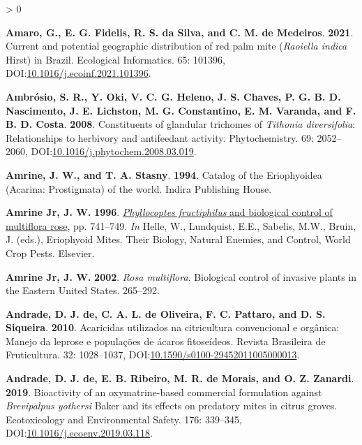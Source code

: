 \documentclass{ufdissertation}[overrideChapters] %
\newlength{\cslhangindent}
\newenvironment{CSLReferences}[2] %
 {%
  \setlength{\parindent}{0pt}
  \ifodd #1 \everypar{\setlength{\hangindent}{\cslhangindent}}\ignorespaces\fi
  \ifnum #2 > 0
  \setlength{\parskip}{#2\baselineskip}
  \fi
 }%
 {}
\begin{document}
{\begin{CSLReferences}{1}{1}
\leavevmode{}%
\textbf{Amaro, G., E. G. Fidelis, R. S. da Silva, and C. M. de Medeiros}. \textbf{2021}. Current and potential geographic distribution of red palm mite ({\emph{Raoiella indica}} {Hirst}) in {Brazil}. Ecological Informatics. 65: 101396, DOI:\href{https://doi.org/10.1016/j.ecoinf.2021.101396}{10.1016/j.ecoinf.2021.101396}.

\leavevmode{}%
\textbf{Ambrósio, S. R., Y. Oki, V. C. G. Heleno, J. S. Chaves, P. G. B. D. Nascimento, J. E. Lichston, M. G. Constantino, E. M. Varanda, and F. B. D. Costa}. \textbf{2008}. Constituents of glandular trichomes of {\emph{Tithonia diversifolia}}: Relationships to herbivory and antifeedant activity. Phytochemistry. 69: 2052--2060, DOI:\href{https://doi.org/10.1016/j.phytochem.2008.03.019}{10.1016/j.phytochem.2008.03.019}.

\leavevmode{}%
\textbf{Amrine, J. W., and T. A. Stasny}. \textbf{1994}. Catalog of the {Eriophyoidea} ({Acarina}: {Prostigmata}) of the world. Indira Publishing House.

\leavevmode{}%
\textbf{Amrine Jr, J. W.} \textbf{1996}. \href{https://doi.org/10.1016/s1572-4379(96)80050-9}{{\emph{Phyllocoptes fructiphilus}} and biological control of multiflora rose}, pp. 741--749. \emph{In} Helle, W., Lundquist, E.E., Sabelis, M.W., Bruin, J. (eds.), Eriophyoid Mites. Their Biology, Natural Enemies, and Control, World Crop Pests. Elsevier.

\leavevmode{}%
\textbf{Amrine Jr, J. W.} \textbf{2002}. {\emph{Rosa multiflora}}. Biological control of invasive plants in the Eastern {United States}. 265--292.

\leavevmode{}%
\textbf{Andrade, D. J. de, C. A. L. de Oliveira, F. C. Pattaro, and D. S. Siqueira}. \textbf{2010}. Acaricidas utilizados na citricultura convencional e org{â}nica: Manejo da leprose e popula{ç}{õ}es de {á}caros fitose{í}deos. Revista Brasileira de Fruticultura. 32: 1028--1037, DOI:\href{https://doi.org/10.1590/s0100-29452011005000013}{10.1590/s0100-29452011005000013}.

\leavevmode{}%
\textbf{Andrade, D. J. de, E. B. Ribeiro, M. R. de Morais, and O. Z. Zanardi}. \textbf{2019}. Bioactivity of an oxymatrine-based commercial formulation against {\emph{Brevipalpus yothersi}} {Baker} and its effects on predatory mites in citrus groves. Ecotoxicology and Environmental Safety. 176: 339--345, DOI:\href{https://doi.org/10.1016/j.ecoenv.2019.03.118}{10.1016/j.ecoenv.2019.03.118}.


\end{CSLReferences}}
\end{document}
